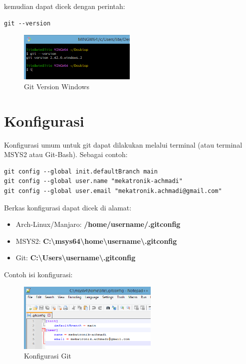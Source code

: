 \documentclass[12pt]{book}
\begin{document}
	\newpage
	kemudian dapat dicek dengan perintah:
	
	\begin{verbatim}
git --version
	\end{verbatim}
	
	\begin{figure}[!ht]
		\centering
		\includegraphics[width=0.5\textwidth]{images/git/gitverwin}
		\caption{Git Version Windows}
	\end{figure}
	
	\section{Konfigurasi}
	
	Konfigurasi umum untuk git dapat dilakukan melalui terminal (atau terminal MSYS2 atau Git-Bash).
	Sebagai contoh:
	
	\begin{verbatim}
git config --global init.defaultBranch main
git config --global user.name "mekatronik-achmadi"
git config --global user.email "mekatronik.achmadi@gmail.com"
	\end{verbatim}
	
	Berkas konfigurasi dapat dicek di alamat:
	
	\begin{itemize}
		\item Arch-Linux/Manjaro: \textbf{/home/username/.gitconfig}
		
		\item MSYS2: \textbf{C:\textbackslash msys64\textbackslash home\textbackslash username\textbackslash .gitconfig}
		
		\item Git: \textbf{C:\textbackslash Users\textbackslash username\textbackslash .gitconfig}
	\end{itemize}
	
	Contoh isi konfigurasi:
	
	\begin{figure}[!ht]
		\centering
		\includegraphics[width=0.6\textwidth]{images/git/gitconfig}
		\caption{Konfigurasi Git}
	\end{figure}
	
\end{document}
